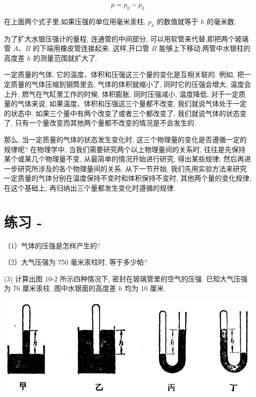 \documentclass[10pt]{article}
\begin{document}
\[
p = {p}_{0} - {p}_{h}
\]

在上面两个式子里,如果压强的单位用毫米汞柱, \({p}_{h}\) 的数值就等于 \(h\) 的毫米数.

为了扩大水银压强计的量程, 连通管的中间部分, 可以用软管来代替,即把两个玻璃管 \(A\text{、}B\) 的下端用橡皮管连接起来. 这样,开口管 \(B\) 能够上下移动,两管中水银柱的高度差 \(h\) 的测量范围就扩大了.

一定质量的气体, 它的温度、体积和压强这三个量的变化是互相关联的. 例如, 把一定质量的气体压缩到钢筒里去, 气体的体积就缩小了, 同时它的压强会增大, 温度会上升. 燃气在气缸里工作的时候, 体积膨胀, 同时压强减小, 温度降低, 对于一定质量的气体来说, 如果温度、体积和压强这三个量都不改变, 我们就说气体处于一定的状态中. 如果三个量中有两个改变了或者三个都改变了, 我们就说气体的状态变了. 只有一个量改变而其他两个量都不改变的情况是不会发生的.

那么, 当一定质量的气体的状态发生变化时, 这三个物理量的变化是否遵循一定的规律呢? 在物理学中, 当我们需要研究两个以上物理量间的关系时, 往往是先保持某个或某几个物理量不变, 从最简单的情况开始进行研究, 得出某些规律; 然后再进一步研究所涉及的各个物理量间的关系. 从下一节开始, 我们先用实验方法来研究一定质量的气体分别在温度保持不变时和体积保持不变时, 其他两个量的变化规律; 在这个基础上, 再归纳出三个量都发生变化时遵循的规律.

\section*{练习 -}

（1）气体的压强是怎样产生的?

（2）大气压强为 750 毫米汞柱时, 等于多少帕?

(3) 计算出图 10-2 所示四种情况下, 密封在玻璃管里的空气的压强. 已知大气压强为 76 厘米汞柱. 图中水银面的高度差 \(h\) 均为 10 厘米.

\begin{center}
\includegraphics[max width=1.0\textwidth]{images/01912d55-147c-70aa-b0e0-1782a122f948_281_775071.jpg}
\end{center}
\end{document}
